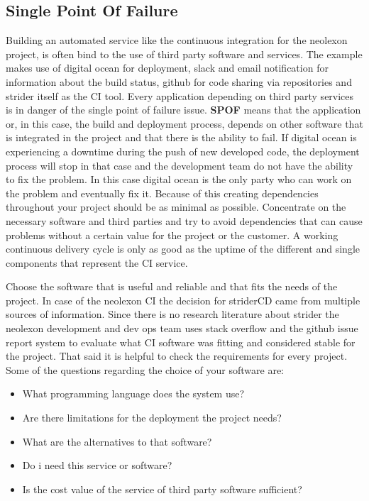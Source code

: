 \subsection{Single Point Of Failure}
\label{section:Single Point Of Failure}
Building an automated service like the continuous integration for the neolexon project, is often bind to the use of third party software and services.
The example makes use of digital ocean for deployment, slack and email notification for information about the build status, github for code sharing
via repositories and strider itself as the CI tool. Every application depending on third party services is in danger of the single point of failure
issue. \textbf{SPOF} means that the application or, in this case, the build and deployment process, depends on other software that is integrated in the
project and that there is the ability to fail. If digital ocean is experiencing a downtime during the push of new developed code, the deployment
process will stop in that case and the development team do not have the ability to fix the problem. In this case digital ocean is the only party
who can work on the problem and eventually fix it. Because of this creating dependencies throughout your project should be as minimal as possible.
Concentrate on the necessary software and third parties and try to avoid dependencies that can cause problems without a certain value for the project
or the customer. A working continuous delivery cycle is only as good as the uptime of the different and single components that represent the CI service.

Choose the software that is useful and reliable and that fits the needs of the project. In case of the neolexon CI the decision for striderCD came from
multiple sources of information. Since there is no research literature about strider the neolexon development and dev ops team uses stack overflow and the
github issue report system to evaluate what CI software was fitting and considered stable for the project. That said it is helpful to check the requirements
for every project. Some of the questions regarding the choice of your software are:

\begin{itemize}
  \item What programming language does the system use?
  \item Are there limitations for the deployment the project needs?
  \item What are the alternatives to that software?
  \item Do i need this service or software?
  \item Is the cost value of the service of third party software sufficient?
\end{itemize}

